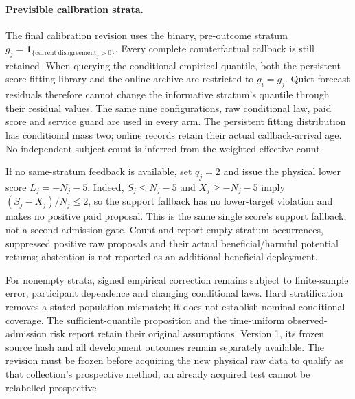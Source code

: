 \paragraph{Previsible calibration strata.}
The final calibration revision uses the binary, pre-outcome stratum
$g_j=\mathbf1_{\{\mathrm{current\ disagreement}_j>0\}}$.
Every complete counterfactual callback is still retained. When querying
the conditional empirical quantile, both the persistent score-fitting
library and the online archive are restricted to $g_i=g_j$. Quiet
forecast residuals therefore cannot change the informative stratum's
quantile through their residual values. The same nine configurations,
raw conditional law, paid score and service guard are used in every arm.
The persistent fitting distribution has conditional mass two; online
records retain their actual callback-arrival age. No independent-subject
count is inferred from the weighted effective count.

If no same-stratum feedback is available, set $q_j=2$ and issue the
physical lower score $L_j=-N_j-5$. Indeed,
$S_j\leq N_j-5$ and $X_j\geq-N_j-5$ imply
$(S_j-X_j)/N_j\leq2$, so the support fallback has no lower-target
violation and makes no positive paid proposal. This is the same single
score's support fallback, not a second admission gate. Count and report
empty-stratum occurrences, suppressed positive raw proposals and their
actual beneficial/harmful potential returns; abstention is not reported
as an additional beneficial deployment.

For nonempty strata, signed empirical correction remains subject to
finite-sample error, participant dependence and changing conditional laws.
Hard stratification removes a stated population mismatch; it does not
establish nominal conditional coverage. The sufficient-quantile proposition
and the time-uniform observed-admission risk report retain their original
assumptions. Version 1, its frozen source hash and all development outcomes
remain separately available. The revision must be frozen before acquiring
the new physical raw data to qualify as that collection's prospective
method; an already acquired test cannot be relabelled prospective.

